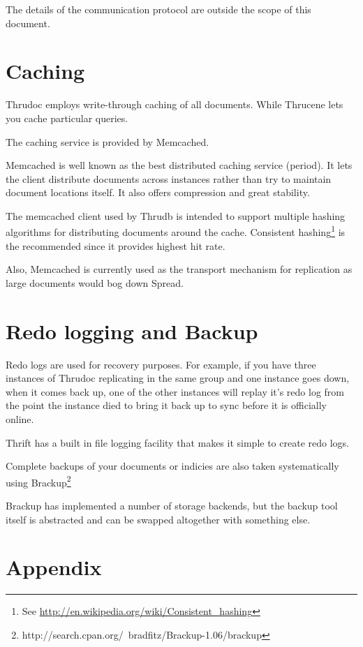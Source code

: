 \documentclass[nocopyrightspace,blockstyle]{sigplanconf}
\begin{document}
The details of the communication protocol are outside the scope of this document.

\section{Caching}

Thrudoc employs write-through caching of all documents. While Thrucene lets you cache particular queries.

The caching service is provided by Memcached.

Memcached is well known as the best distributed caching service (period).
It lets the client distribute documents across instances rather than try to maintain document locations itself.
It also offers compression and great stability.

The memcached client used by Thrudb is intended to support multiple hashing algorithms for distributing documents around the cache.
Consistent hashing\footnote{See \url{http://en.wikipedia.org/wiki/Consistent_hashing}} is the recommended since it provides highest hit rate.

Also, Memcached is currently used as the transport mechanism for replication as large documents would bog down Spread.

\section{Redo logging and Backup}

Redo logs are used for recovery purposes.
For example, if you have three instances of Thrudoc replicating in the same group and one instance goes down, when it comes back up,
one of the other instances will replay it's redo log from the point the instance died to bring it back up to sync before it is
officially online.

Thrift has a built in file logging facility that makes it simple to create redo logs.

Complete backups of your documents or indicies are also taken systematically using Brackup\footnote{http://search.cpan.org/~bradfitz/Brackup-1.06/brackup}

Brackup has implemented a number of storage backends, but the backup tool itself is abstracted and can be swapped altogether with something else.

\section{Appendix}
\end{document}
